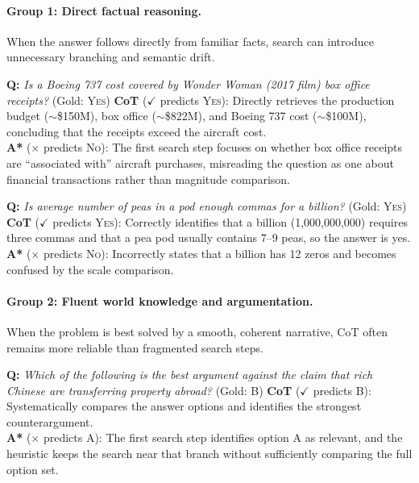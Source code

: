 \documentclass[11pt]{article}
\begin{document}
{\paragraph{Group 1: Direct factual reasoning.}
When the answer follows directly from familiar facts, search can introduce unnecessary branching and semantic drift.

\begin{examplebox}[title=StrategyQA --- Direct Factual Reasoning]
\textbf{Q:} \emph{Is a Boeing 737 cost covered by \textit{Wonder Woman} (2017 film) box office receipts?} \quad (Gold: \textsc{Yes})
\tcblower
\textbf{CoT} ($\checkmark$ predicts \textsc{Yes}): Directly retrieves the production budget ($\sim$\$150M), box office ($\sim$\$822M), and Boeing 737 cost ($\sim$\$100M), concluding that the receipts exceed the aircraft cost.\\[4pt]
\textbf{A*} ($\times$ predicts \textsc{No}): The first search step focuses on whether box office receipts are ``associated with'' aircraft purchases, misreading the question as one about financial transactions rather than magnitude comparison.
\end{examplebox}

\begin{examplebox}[title=StrategyQA --- Direct Factual Reasoning]
\textbf{Q:} \emph{Is average number of peas in a pod enough commas for a billion?} \quad (Gold: \textsc{Yes})
\tcblower
\textbf{CoT} ($\checkmark$ predicts \textsc{Yes}): Correctly identifies that a billion (1,000,000,000) requires three commas and that a pea pod usually contains 7--9 peas, so the answer is yes.\\[4pt]
\textbf{A*} ($\times$ predicts \textsc{No}): Incorrectly states that a billion has 12 zeros and becomes confused by the scale comparison.
\end{examplebox}

\paragraph{Group 2: Fluent world knowledge and argumentation.}
When the problem is best solved by a smooth, coherent narrative, CoT often remains more reliable than fragmented search steps.

\begin{examplebox}[title=LogicQA --- Fluent Argumentation]
\textbf{Q:} \emph{Which of the following is the best argument against the claim that rich Chinese are transferring property abroad?} \quad (Gold: B)
\tcblower
\textbf{CoT} ($\checkmark$ predicts B): Systematically compares the answer options and identifies the strongest counterargument.\\[4pt]
\textbf{A*} ($\times$ predicts A): The first search step identifies option A as relevant, and the heuristic keeps the search near that branch without sufficiently comparing the full option set.
\end{examplebox}

}
\end{document}
